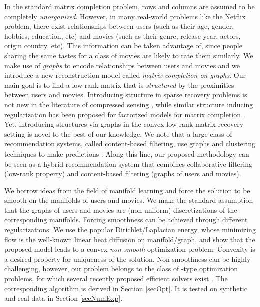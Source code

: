 \documentclass{article}
\begin{document}
In the standard matrix completion problem, rows and columns are assumed to be completely {\it unorganized}. However, in many real-world problems like the Netflix problem, there exist relationships between users (such as their age, gender, hobbies, education, etc) and movies (such as their genre, release year, actors, origin country, etc). This information can be taken advantage of, since people sharing the same tastes for a class of movies are likely to rate them similarly. We make use of {\it graphs} to encode relationships between users and movies and we introduce a new reconstruction model called {\it matrix completion on graphs}. Our main goal is to find a low-rank matrix that is {\it structured} by the proximities between users and movies. 
Introducing structure in sparse recovery problems is not new in the literature of compressed sensing  \cite{pro:HuangZhangMetaxas09StrucSpars,art:BaraniukCevherDuarteHegde10SparStru, art:JenattonAudibertBach11SparStru}, while similar structure inducing regularization has been proposed for factorized models for matrix completion \cite{ma2011recommender}. Yet, introducing structures via graphs in the convex low-rank matrix recovery setting is novel to the best of our knowledge. 
We note that a large class of recommendation systems, called content-based filtering, use graphs and clustering techniques to make predictions \cite{huang2002graph}. Along this line, our proposed methodology can be seen as a hybrid recommendation system that combines collaborative filtering (low-rank property) and content-based filtering (graphs of users and movies).  

We borrow ideas from the field of manifold learning \cite{belkin2001laplacian,belkin2003laplacian} and force the solution to be smooth on the manifolds of users and movies. We make the standard assumption that the graphs of users and movies are (non-uniform) discretizations of the corresponding manifolds. Forcing smoothness can be achieved through different regularizations. We use the popular Dirichlet/Laplacian energy, whose minimizing flow is the well-known linear heat diffusion on manifold/graph, and show that the proposed model leads to a convex {\it non-smooth} optimization problem. Convexity is a desired property for uniqueness of the solution. Non-smoothness can be highly challenging, however, our problem belongs to the class of -type optimization problems, for which several recently proposed efficient solvers exist \cite{boyd2011distributed,combettes2011proximal,nesterov2013first}.  The corresponding algorithm is derived in Section \ref{secOpt}. It is tested on synthetic and real data \cite{pro:Miller03MovieLens} in Section \ref{secNumExp}.
\end{document}
